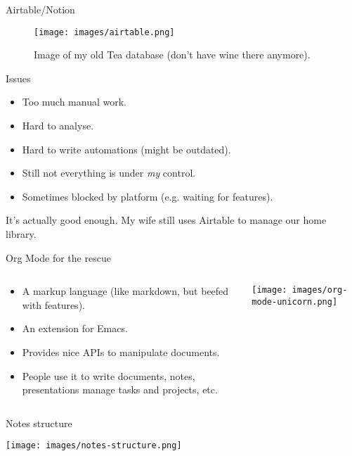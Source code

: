 \documentclass[presentation,aspectratio=169,smaller]{beamer}
\begin{document}
\begin{frame}[label={sec:org717a093}]{Airtable/Notion}
\begin{figure}[htbp]
\centering
\texttt{[image: images/airtable.png]}
\caption{Image of my old Tea database (don't have wine there anymore).}
\end{figure}
\end{frame}

\begin{frame}[label={sec:org4f85c59}]{Issues}
\begin{itemize}
\item Too much manual work.
\item Hard to analyse.
\item Hard to write automations (might be outdated).
\item Still not everything is under \emph{my} control.
\item Sometimes blocked by platform (e.g. waiting for features).
\end{itemize}

It's actually good enough. My wife still uses Airtable to manage our home library.
\end{frame}

\begin{frame}[label={sec:org2e71fe0}]{Org Mode for the rescue}
\begin{columns}
\begin{column}{0.75\columnwidth}
\begin{itemize}
\item A markup language (like markdown, but beefed with features).
\item An extension for Emacs.
\item Provides nice APIs to manipulate documents.
\item People use it to write documents, notes, presentations manage tasks and projects, etc.
\end{itemize}
\end{column}

\begin{column}{0.25\columnwidth}
\begin{center}
\texttt{[image: images/org-mode-unicorn.png]}
\end{center}
\end{column}
\end{columns}
\end{frame}

\begin{frame}[label={sec:org64d8ecd}]{Notes structure}
\begin{center}
\texttt{[image: images/notes-structure.png]}
\end{center}
\end{frame}
\end{document}
